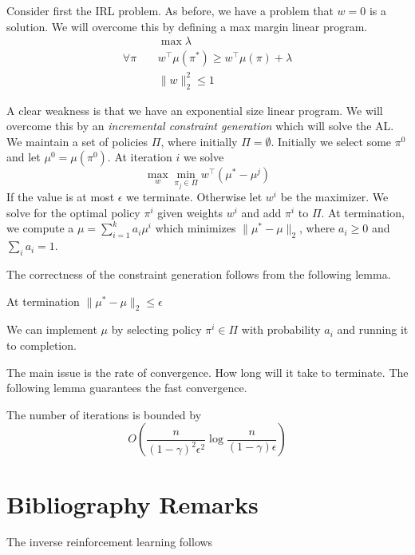Consider first the IRL problem. As before, we have a problem that
$w=0$ is a solution. We will overcome this by defining a max margin
linear program.
\begin{align*}
& \max \lambda\\
\forall \pi\;\;\;\;  &  w^\top \mu(\pi^*) \geq w^\top\mu(\pi) +\lambda \\
& \|w\|_2^2 \leq 1
\end{align*}

A clear weakness is that we have an exponential size linear program.
We will overcome this by an {\em incremental constraint generation}
which will solve the AL. We maintain a set of policies $\Pi$, where
initially $\Pi=\emptyset$. Initially we select some $\pi^0$ and let
$\mu^0=\mu(\pi^0)$. At iteration $i$ we solve
\[
\max_w \min_{\pi_j\in \Pi} w^\top (\mu^*-\mu^j)
\]
If the value is at most $\epsilon$ we terminate. Otherwise let $w^i$
be the maximizer. We solve for the optimal policy $\pi^i$ given
weights $w^i$ and add $\pi^i$ to $\Pi$. At termination, we compute a
$\mu=\sum_{i=1}^k a_i\mu^i$ which minimizes $\|\mu^*-\mu\|_2$, where
$a_i\geq 0$ and $\sum_i a_i=1$.

The correctness of the constraint generation follows from the
following lemma.
\begin{lemma}
At termination $\|\mu^*-\mu\|_2\leq \epsilon$
\end{lemma}
We can implement $\mu$ by selecting policy $\pi^i\in\Pi$  with
probability $a_i$ and running it to completion.

The main issue is the rate of convergence. How long will it take to
terminate. The following lemma guarantees the fast convergence.
\begin{lemma}
The number of iterations is bounded by
\[
O(\frac{n}{(1-\gamma)^2\epsilon^2}\log\frac{n}{(1-\gamma)\epsilon})
\]
\end{lemma}
\section{Bibliography Remarks}


The inverse reinforcement learning follows \cite{PieterN04,NgR00}
